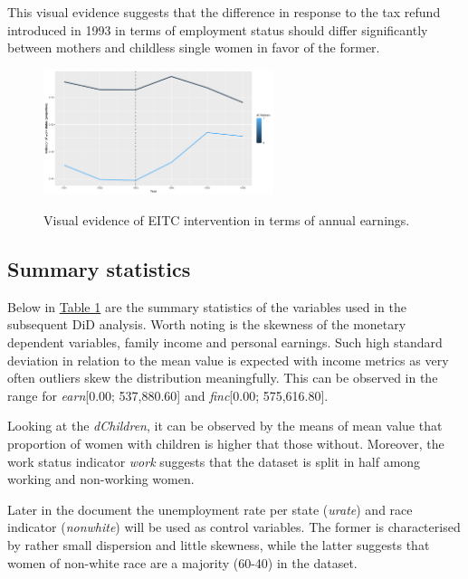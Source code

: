 \documentclass{article}
\begin{document}
This visual evidence suggests that the difference in response to the tax refund introduced in 1993 in terms of employment status should differ significantly between mothers and childless single women in favor of the former.

\begin{figure}[!htbp]
    \caption{Visual evidence of EITC intervention in terms of annual earnings.}
    \centering
    \includegraphics[width=0.6\textwidth]{lineWorkEffect.png}
    \label{fig:work}
\end{figure}


\subsection{Summary statistics}

Below in \hyperref[tab:descriptive]{Table 1} are the summary statistics of the variables used in the subsequent DiD analysis. Worth noting is the skewness of the monetary dependent variables, family income and personal earnings. Such high standard deviation in relation to the mean value is expected with income metrics as very often outliers skew the distribution meaningfully. This can be observed in the range for \emph{earn}[0.00; 537,880.60] and \emph{finc}[0.00; 575,616.80].

Looking at the \emph{dChildren}, it can be observed by the means of mean value that proportion of women with children is higher that those without. Moreover, the work status indicator \emph{work} suggests that the dataset is split in half among working and non-working women.  

Later in the document the unemployment rate per state (\emph{urate}) and race indicator (\emph{nonwhite}) will be used as control variables. The former is characterised by rather small dispersion and little skewness, while the latter suggests that women of non-white race are a majority (60-40) in the dataset.
\end{document}
